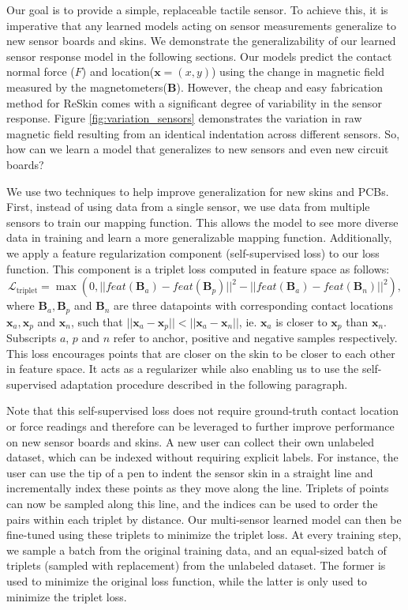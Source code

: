 \documentclass{article}
\let\vec\mathbf
\begin{document}
Our goal is to provide a simple, replaceable tactile sensor. To achieve this, it is imperative that any learned models acting on sensor measurements generalize to new sensor boards and skins. We demonstrate the generalizability of our learned sensor response model in the following sections. Our models predict the contact normal force ($F$) and location($\vec{x} = (x,y)$) using the change in magnetic field measured by the magnetometers($\vec{B}$). However, the cheap and easy fabrication method for ReSkin comes with a significant degree of variability in the sensor response. Figure \ref{fig:variation_sensors} demonstrates the variation in raw magnetic field resulting from an identical indentation across different sensors. So, how can we learn a model that generalizes to new sensors and even new circuit boards?

We use two techniques to help improve generalization for new skins and PCBs. First, instead of using data from a single sensor, we use data from multiple sensors to train our mapping function. This allows the model to see more diverse data in training and learn a more generalizable mapping function. Additionally, we apply a feature regularization component (self-supervised loss) to our loss function. This component is a triplet loss computed in feature space as follows:
\begin{equation}
    \mathcal{L}_{\text{triplet}} = \max\left( 0, ||feat(\vec{B}_a) - feat(\vec{B}_p)||^2 - ||feat(\vec{B}_a) - feat(\vec{B}_n)||^2 \right),
\end{equation}
where $\vec{B}_a, \vec{B}_p$ and $\vec{B}_n$ are three datapoints with corresponding contact locations $\vec{x}_a, \vec{x}_p$ and $\vec{x}_n$, such that $ ||\vec{x}_a - \vec{x}_p|| < ||\vec{x}_a - \vec{x}_n||$, ie. $\vec{x}_a$ is closer to $\vec{x}_p$ than $\vec{x}_n$. Subscripts $a$, $p$ and $n$ refer to anchor, positive and negative samples respectively. This loss encourages points that are closer on the skin to be closer to each other in feature space. It acts as a regularizer while also enabling us to use the self-supervised adaptation procedure described in the following paragraph.

Note that this self-supervised loss does not require ground-truth contact location or force readings and therefore can be leveraged to further improve performance on new sensor boards and skins. A new user can collect their own unlabeled dataset, which can be indexed without requiring explicit labels. For instance, the user can use the tip of a pen to indent the sensor skin in a straight line and incrementally index these points as they move along the line. Triplets of points can now be sampled along this line, and the indices can be used to order the pairs within each triplet by distance. Our multi-sensor learned model can then be fine-tuned using these triplets to minimize the triplet loss. At every training step, we sample a batch from the original training data, and an equal-sized batch of triplets (sampled with replacement) from the unlabeled dataset. The former is used to minimize the original loss function, while the latter is only used to minimize the triplet loss.
\vspace{-0.1in}
\end{document}
